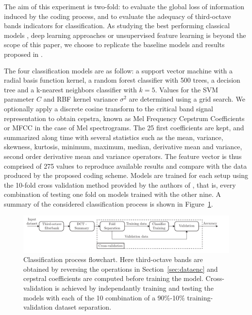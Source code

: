 \documentclass[sensors,article,submit,moreauthors,pdftex,10pt,a4paper]{mdpi}
\begin{document}
The aim of this experiment is two-fold: to evaluate the global loss of information induced by the coding process, and to evaluate the adequacy of third-octave bands indicators for classification. As studying the best performing classical models \citep{ntalampiras2013}, deep learning approaches \citep{salamon2017} or unsupervised feature learning is beyond the scope of this paper, we choose to replicate the baseline models and results proposed in \cite{salamon2014}.

The four classification models are as follow: a support vector machine with a radial basis function kernel, a random forest classifier with 500 trees, a decision tree and a k-nearest neighbors classifier with $k = 5$. Values for the SVM parameter $C$ and RBF kernel variance $\sigma^2$ are determined using a grid search. We optionally apply a discrete cosine transform to the critical band signal representation to obtain cepstra, known as Mel Frequency Cepstrum Coefficients or MFCC in the case of Mel spectrograms. The 25 first coefficients are kept, and summarized along time with several statistics such as the mean, variance, skewness, kurtosis, minimum, maximum, median, derivative mean and variance, second order derivative mean and variance operators. The feature vector is thus comprised of 275 values to reproduce available results and compare with the data produced by the proposed coding scheme. Models are trained for each setup using the 10-fold cross validation method provided by the authors of \cite{salamon2014}, that is, every combination of testing one fold on models trained with the other nine. A summary of the considered classification process is shown in Figure~\ref{fig:class_flwc}.

\begin{figure}[t]
	\centering
		\includegraphics[width=.9\textwidth]{figures/class.pdf}
	\caption{Classification process flowchart. Here third-octave bands are obtained by reversing the operations in Section~\ref{sec:dataenc} and cepstral coefficients are computed before training the model. Cross-validation is achieved by independantly training and testing the models with each of the 10 combination of a 90\%-10\% training-validation dataset separation.}
	\label{fig:class_flwc}
\end{figure}
\end{document}
